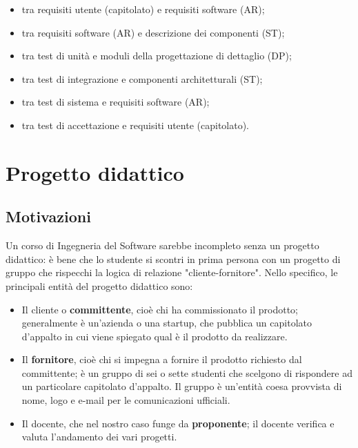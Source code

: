 \documentclass[a4paper]{article}
\begin{document}
	\begin{itemize}
		
			
	\item tra requisiti utente (capitolato) e requisiti software (AR);
			
	\item tra requisiti software (AR) e descrizione dei componenti (ST);
			
	\item tra test di unità e moduli della progettazione di dettaglio (DP);
			
	\item tra test di integrazione e componenti architetturali (ST);
			
	\item tra test di sistema e requisiti software (AR);
			
	\item tra test di accettazione e requisiti utente (capitolato).
		
	\end{itemize}

	


		
	\section{Progetto didattico}


		
	\subsection{Motivazioni}

		
Un corso di Ingegneria del Software sarebbe incompleto senza un progetto didattico: è bene che lo studente si scontri in prima persona con un progetto di gruppo che rispecchi la logica di relazione "cliente-fornitore". Nello specifico, le principali entità del progetto didattico sono:
		
	\begin{itemize}
		
			
	\item Il cliente o \textbf{committente}, cioè chi ha commissionato il prodotto; generalmente è un'azienda o una startup, che pubblica un capitolato d'appalto in cui viene spiegato qual è il prodotto da realizzare.
			
	\item Il \textbf{fornitore}, cioè chi si impegna a fornire il prodotto richiesto dal committente; è un gruppo di sei o sette studenti che scelgono di rispondere ad un particolare capitolato d'appalto. Il gruppo è un'entità coesa provvista di nome, logo e e-mail per le comunicazioni ufficiali.
			
	\item Il docente, che nel nostro caso funge da \textbf{proponente}; il docente verifica e valuta l'andamento dei vari progetti.
		
	\end{itemize}
\end{document}
